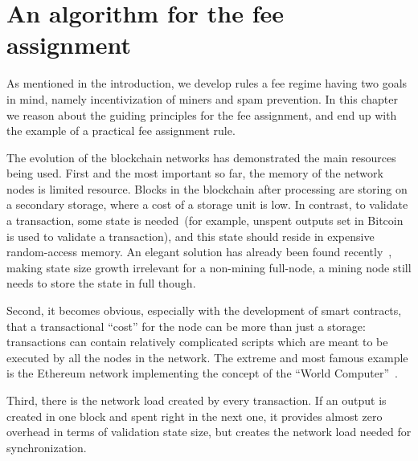 \documentclass[]{llncs}   %
\begin{document}
\section{An algorithm for the fee assignment}
\label{sec:algorithm}

As mentioned in the introduction, we develop rules a fee regime having two goals
in mind, namely incentivization of miners and spam prevention.  In this chapter
we reason about the guiding  principles for the fee assignment, and end up with
the example of a practical fee assignment rule.

The evolution of the blockchain networks has demonstrated the main resources
being used. First and the most important so far, the memory of the network nodes 
is limited resource. Blocks in the blockchain after processing are storing on a 
secondary storage, where a cost of a storage unit is low. In contrast, to validate a 
transaction, some state is needed~(for example, unspent outputs set in Bitcoin is used 
to validate a transaction), and this state should reside in expensive random-access memory.   
An elegant solution has already been found recently~\cite{reyzin2016improving}, making state size growth irrelevant for 
a non-mining full-node, a mining node still needs to store the state in full though.

Second, it becomes obvious, especially with the development of smart contracts,
that a transactional ``cost'' for the node can be more than just a storage:
transactions can contain relatively complicated scripts which are meant to be
executed by all the nodes in the network. The extreme and most famous example is
the Ethereum network implementing the concept of the ``World Computer''~\cite{ethyp}. 

Third, there is the network load created by every transaction. If an output is
created in one block and spent right in the next one, it provides almost zero
overhead in terms of validation state size, but creates the network load needed
for synchronization.
\end{document}
